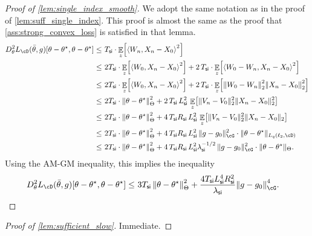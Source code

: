\documentclass[11pt]{article} %
\newcommand{\pref}[1]{\cref{#1}}
\newcommand{\pfref}[1]{Proof of \pref{#1}}
\theoremstyle{theorem}  %
\theoremstyle{plain}
\DeclarePairedDelimiter{\brk}{[}{]}
\DeclarePairedDelimiter{\nrm}{\|}{\|}
\DeclarePairedDelimiter{\tri}{\langle}{\rangle}
\DeclareMathOperator{\En}{\mathbb{E}}
\newcommand{\ls}{\ell}
\newcommand{\poprisk}{L_{\cD}}
\newcommand{\nuisance}{\cG}
\newcommand{\target}{\Theta}
\newcommand{\besttwo}{\theta^{\star}}
\newcommand{\gtone}{g_0}
\newcommand{\si}{\mathsf{si}}
\newcommand{\Lsi}{L_{\si}}
\newcommand{\Rsi}{R_{\si}}
\newcommand{\Tsi}{T_{\si}}
\newcommand{\gammasi}{\lambda_{\si}}
\begin{document}
\begin{proof}[\pfref{lem:single_index_smooth}]
We adopt the same notation as in the proof of \pref{lem:suff_single_index}. This proof is almost the same as the proof that \pref{ass:strong_convex_loss} is satisfied in that lemma.
\begin{align*}
D^{2}_{\theta}\poprisk(\bar{\theta}, g)[\theta{}-\besttwo, \theta{}-\besttwo] \leq~& \Tsi \cdot \En_{z}\brk*{
\tri*{W_n, X_n - X_0}^{2}}\\
\leq~& 2\Tsi \cdot \En_{z}\brk*{
\tri*{W_0, X_n - X_0}^{2}} + 2\,\Tsi \cdot \En_{z}\brk*{
\tri*{W_0 - W_n, X_n - X_0}^{2}}\\
\leq~& 2\Tsi \cdot \En_{z}\brk*{
\tri*{W_0, X_n - X_0}^{2}} + 2\,\Tsi \cdot \En_{z}\brk*{
\nrm*{W_0 - W_n}_{2}^{2}\nrm*{X_n - X_0}^{2}_{2}}\\
\leq~& 2\Tsi \cdot \nrm*{\theta{}-\besttwo}_{\target}^2 +
       2\,\Tsi\,\Lsi^2\, \En_{z}\brk*{\|V_n-V_0\|^2_{2} \|X_n -
       X_0\|_2^{2}} \\
                     \leq~& 2\Tsi \cdot \nrm*{\theta{}-\besttwo}_{\target}^2 +
                            4\,\Tsi\Rsi\,\Lsi^2\, \En_{z}\brk*{\|V_n-V_0\|^2_{2} \|X_n -
                            X_0\|_2} \\
                            \leq~& 2\Tsi \cdot \nrm*{\theta{}-\besttwo}_{\target}^2 +
                                   4\,\Tsi\Rsi\,\Lsi^2\,
                                   \nrm{g-\gtone}_{\nuisance}^2\cdot{}\nrm{\theta-\besttwo}_{L_q(\ls_2,\cD)}\\
                                                               \leq~& 2\Tsi \cdot \nrm*{\theta{}-\besttwo}_{\target}^2 +
                                                                      4\,\Tsi\Rsi\,\Lsi^2\gammasi^{-1/2}\, \nrm{g-\gtone}_{\nuisance}^2\cdot{}\nrm{\theta-\besttwo}_{\target}.
\end{align*}
Using the AM-GM inequality, this implies the inequality
%
%
%
%
%
%
%
\begin{align*}
D^{2}_{\theta}\poprisk(\bar{\theta}, g)[\theta{}-\besttwo, \theta{}-\besttwo] \leq~& 3\Tsi \, \nrm*{\theta{}-\besttwo}_{\target}^2 + \frac{4\Tsi \Lsi^4  \Rsi^2}{\gammasi}\nrm*{g - \gtone}_{\nuisance}^4.
\end{align*}
\end{proof}


\begin{proof}[\pfref{lem:sufficient_slow}] Immediate.
\end{proof}


%
%
%
%
 
\end{document}
